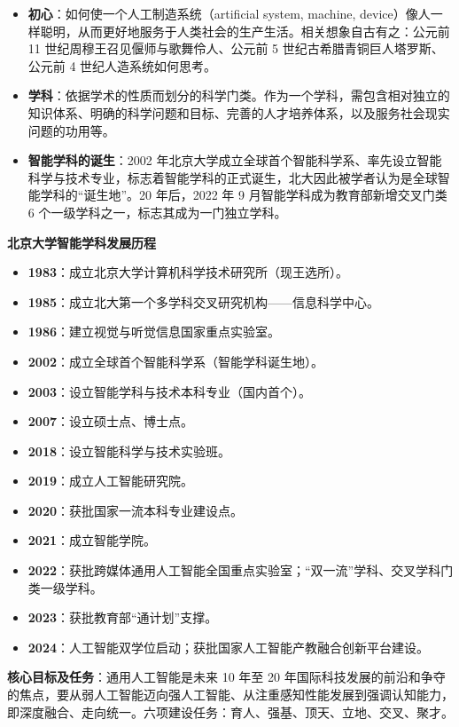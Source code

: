 \begin{itemize}[itemsep=2pt]
    \item \textbf{初心}：如何使一个人工制造系统（artificial system, machine, device）像人一样聪明，从而更好地服务于人类社会的生产生活。相关想象自古有之：公元前 11 世纪周穆王召见偃师与歌舞伶人、公元前 5 世纪古希腊青铜巨人塔罗斯、公元前 4 世纪人造系统如何思考。
    \item \textbf{学科}：依据学术的性质而划分的科学门类。作为一个学科，需包含相对独立的知识体系、明确的科学问题和目标、完善的人才培养体系，以及服务社会现实问题的功用等。
    \item \textbf{智能学科的诞生}：2002 年北京大学成立全球首个智能科学系、率先设立智能科学与技术专业，标志着智能学科的正式诞生，北大因此被学者认为是全球智能学科的“诞生地”。20 年后，2022 年 9 月智能学科成为教育部新增交叉门类 6 个一级学科之一，标志其成为一门独立学科。
\end{itemize}

\textbf{北京大学智能学科发展历程}

\begin{itemize}[itemsep=1pt]
    \item \textbf{1983}：成立北京大学计算机科学技术研究所（现王选所）。
    \item \textbf{1985}：成立北大第一个多学科交叉研究机构——信息科学中心。
    \item \textbf{1986}：建立视觉与听觉信息国家重点实验室。
    \item \textbf{2002}：成立全球首个智能科学系（智能学科诞生地）。
    \item \textbf{2003}：设立智能学科与技术本科专业（国内首个）。
    \item \textbf{2007}：设立硕士点、博士点。
    \item \textbf{2018}：设立智能科学与技术实验班。
    \item \textbf{2019}：成立人工智能研究院。
    \item \textbf{2020}：获批国家一流本科专业建设点。
    \item \textbf{2021}：成立智能学院。
    \item \textbf{2022}：获批跨媒体通用人工智能全国重点实验室；“双一流”学科、交叉学科门类一级学科。
    \item \textbf{2023}：获批教育部“通计划”支撑。
    \item \textbf{2024}：人工智能双学位启动；获批国家人工智能产教融合创新平台建设。
\end{itemize}

\textbf{核心目标及任务}：通用人工智能是未来 10 年至 20 年国际科技发展的前沿和争夺的焦点，要从弱人工智能迈向强人工智能、从注重感知性能发展到强调认知能力，即深度融合、走向统一。六项建设任务：育人、强基、顶天、立地、交叉、聚才。

